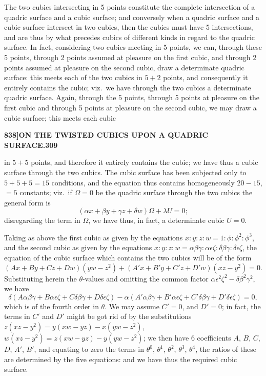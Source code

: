 \documentclass[11pt,a4paper]{book}
\begin{document}
The two cubics intersecting in 5 points constitute the complete intersection of a quadric surface and a cubic surface; and conversely when a quadric surface and a cubic surface intersect in two cubics, then the cubics must have 5 intersections, and are thus by what precedes cubics of different kinds in regard to the quadric surface. In fact, considering two cubics meeting in 5 points, we can, through these 5 points, through 2 points assumed at pleasure on the first cubic, and through 2 points assumed at pleasure on the second cubic, draw a determinate quadric surface: this meets each of the two cubics in $5 + 2$ points, and consequently it entirely contains the cubic; viz.\ we have through the two cubics a determinate quadric surface. Again, through the 5 points, through 5 points at pleasure on the first cubic and through 5 points at pleasure on the second cubic, we may draw a cubic surface; this meets each cubic

\newpage
\setcounter{page}{309}

\noindent\textbf{838]}\hfill\textbf{ON THE TWISTED CUBICS UPON A QUADRIC SURFACE.}\hfill\textbf{309}

\bigskip

\noindent in $5 + 5$ points, and therefore it entirely contains the cubic; we have thus a cubic surface through the two cubics. The cubic surface has been subjected only to $5 + 5 + 5 = 15$ conditions, and the equation thus contains homogeneously $20 - 15$, $= 5$ constants; viz.\ if $\Omega = 0$ be the quadric surface through the two cubics the general form is
\[
(\alpha x + \beta y + \gamma z + \delta w)\Omega + \lambda U = 0;
\]
disregarding the term in $\Omega$, we have thus, in fact, a determinate cubic $U = 0$.

Taking as above the first cubic as given by the equations $x : y : z : w = 1 : \phi : \phi^2 : \phi^3$, and the second cubic as given by the equations $x : y : z : w = \alpha\beta\gamma : \alpha\epsilon\zeta : \delta\beta\gamma : \delta\epsilon\zeta$, the equation of the cubic surface which contains the two cubics will be of the form
\[
(Ax + By + Cz + Dw)(yw - z^2) + (A'x + B'y + C'z + D'w)(xz - y^2) = 0.
\]
Substituting herein the $\theta$-values and omitting the common factor $\alpha\epsilon^2\zeta^2 - \delta\beta^2\gamma^2$, we have
\[
\delta(A\alpha\beta\gamma + B\alpha\epsilon\zeta + C\delta\beta\gamma + D\delta\epsilon\zeta) - \alpha(A'\alpha\beta\gamma + B'\alpha\epsilon\zeta + C'\delta\beta\gamma + D'\delta\epsilon\zeta) = 0,
\]
which is of the fourth order in $\theta$. We may assume $C' = 0$, and $D' = 0$; in fact, the terms in $C'$ and $D'$ might be got rid of by the substitutions $z(xz - y^2) = y(xw - yz) - x(yw - z^2)$, $w(xz - y^2) = z(xw - yz) - y(yw - z^2)$; we then have 6 coefficients $A$, $B$, $C$, $D$, $A'$, $B'$, and equating to zero the terms in $\theta^0$, $\theta^1$, $\theta^2$, $\theta^3$, $\theta^4$, the ratios of these are determined by the five equations: and we have thus the required cubic surface.
\end{document}
